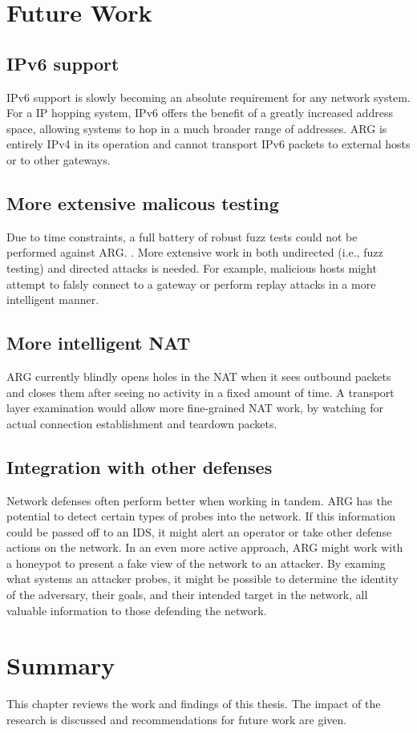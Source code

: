 \section{Future Work}
\label{sec:future_work}
\subsection{IPv6 support}
\par \ac{IPv6} support is slowly becoming an absolute requirement for any network system. For a \ac{IP} hopping system, \ac{IPv6} offers the benefit of a greatly increased address space, allowing systems to hop in a much broader range of addresses. \ac{ARG} is entirely \ac{IPv4} in its operation and cannot transport \ac{IPv6} packets to external hosts or to other gateways.

\subsection{More extensive malicous testing}
\par Due to time constraints, a full battery of robust fuzz tests could not be performed against \ac{ARG}. . More extensive work in both undirected (i.e., fuzz testing) and directed attacks is needed. For example, malicious hosts might attempt to falsly connect to a gateway or perform replay attacks in a more intelligent manner. 

\subsection{More intelligent NAT}
\par \ac{ARG} currently blindly opens holes in the \ac{NAT} when it sees outbound packets and closes them after seeing no activity in a fixed amount of time. A transport layer examination would allow more fine-grained \ac{NAT} work, by watching for actual connection establishment and teardown packets. 

\subsection{Integration with other defenses}
\par Network defenses often perform better when working in tandem. \ac{ARG} has the potential to detect certain types of probes into the network. If this information could be passed off to an \ac{IDS}, it might alert an operator or take other defense actions on the network. In an even more active approach, \ac{ARG} might work with a honeypot to present a fake view of the network to an attacker. By examing what systems an attacker probes, it might be possible to determine the identity of the adversary, their goals, and their intended target in the network, all valuable information to those defending the network.

\section{Summary}
\par This chapter reviews the work and findings of this thesis. The impact of the research is discussed and recommendations for future work are given.

